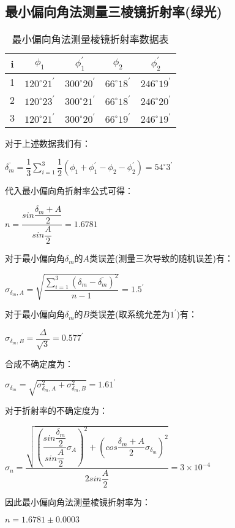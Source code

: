 \documentclass[a4 paper,12pt]{article}
\begin{document}
\subsection{最小偏向角法测量三棱镜折射率(绿光)}
\begin{table}[H]
	\centering
	\caption{最小偏向角法测量棱镜折射率数据表}
	\label{最小偏向角法测量棱镜折射率数据表}
	\begin{tabular}{c|*{4}{c}}
		\toprule[0.5mm]
		i&$\phi_{1}$&$\phi_{1}^{\prime}$&$\phi_{2}$&$\phi_{2}^{\prime}$\\
		\midrule
		1&$120^{\circ}21^{\prime}$&$300^{\circ}20^{\prime}$&$66^{\circ}18^{\prime}$&$246^{\circ}19^{\prime}$\\
		2&$120^{\circ}23^{\prime}$&$300^{\circ}21^{\prime}$&$66^{\circ}18^{\prime}$&$246^{\circ}20^{\prime}$\\
		3&$120^{\circ}21^{\prime}$&$300^{\circ}20^{\prime}$&$66^{\circ}19^{\prime}$&$246^{\circ}19^{\prime}$\\
		\bottomrule[0.5mm]
	\end{tabular}
\end{table}
对于上述数据我们有：
\begin{center}
	$\bar{\delta_{m}}=\dfrac{1}{3}\sum\limits_{i=1}^{3}\dfrac{1}{2}(\phi_{1}+\phi_{1}^{\prime}-\phi_{2}-\phi_{2}^{\prime})=54^{\circ}3^{\prime}$
\end{center}
\par 代入最小偏向角折射率公式可得：
\begin{center}
	$n=\dfrac{sin\dfrac{\delta_{m}+A}{2}}{sin\dfrac{A}{2}}=1.6781$
\end{center}
\par 对于最小偏向角$\delta_{m}$的$A$类误差(测量三次导致的随机误差)有：
\begin{center}
	$\sigma_{\delta_{m},A}=\sqrt{\dfrac{\sum\limits_{i=1}^{3}(\delta_{m}-\bar{\delta_{m}})^{2}}{n-1}}=1.5^{\prime}$
\end{center}
\par 对于最小偏向角$\delta_{m}$的$B$类误差(取系统允差为$1^{\prime}$)有：
\begin{center}
	$\sigma_{\delta_{m},B}=\dfrac{\Delta}{\sqrt{3}}=0.577^{\prime}$
\end{center}
\par 合成不确定度为：
\begin{center}
	$\sigma_{\delta_{m}}=\sqrt{\sigma_{\delta_{m},A}^{2}+\sigma_{\delta_{m},B}^{2}}=1.61^{\prime}$
\end{center}
\par 对于折射率的不确定度为：
\begin{center}
	$\sigma_{n}=\dfrac{\sqrt{\left(\dfrac{sin\dfrac{\delta_{m}}{2}}{sin\dfrac{A}{2}}\sigma_{A}\right)^{2}+\left(cos\dfrac{\delta_{m}+A}{2}\sigma_{\delta_{m}}\right)^{2}}}{2sin\dfrac{A}{2}}=3\times10^{-4}$
\end{center}
\par 因此最小偏向角法测量棱镜折射率为：
\begin{center}
	$n=1.6781\pm 0.0003$
\end{center}
\end{document}
